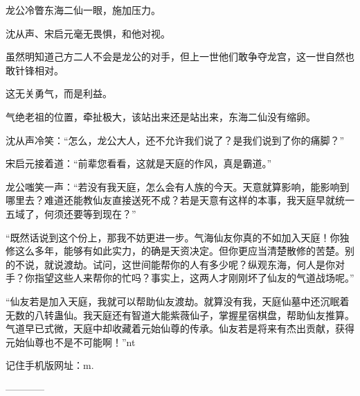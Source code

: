 \begin{this_body}
龙公冷瞥东海二仙一眼，施加压力。

沈从声、宋启元毫无畏惧，和他对视。

虽然明知道己方二人不会是龙公的对手，但上一世他们敢争夺龙宫，这一世自然也敢针锋相对。

这无关勇气，而是利益。

气绝老祖的位置，牵扯极大，该站出来还是站出来，东海二仙没有缩卵。

沈从声冷笑：“怎么，龙公大人，还不允许我们说了？是我们说到了你的痛脚？”

宋启元接着道：“前辈您看看，这就是天庭的作风，真是霸道。”

龙公嗤笑一声：“若没有我天庭，怎么会有人族的今天。天意就算影响，能影响到哪里去？难道还能教仙友直接送死不成？若是天意有这样的本事，我天庭早就统一五域了，何须还要等到现在？”

“既然话说到这个份上，那我不妨更进一步。气海仙友你真的不如加入天庭！你独修这么多年，能够有如此实力，的确是天资决定。但你更应当清楚散修的苦楚。别的不说，就说渡劫。试问，这世间能帮你的人有多少呢？纵观东海，何人是你对手？你指望这些人来帮你的忙吗？事实上，这两人才刚刚坏了仙友的气道战场呢。”

“仙友若是加入天庭，我就可以帮助仙友渡劫。就算没有我，天庭仙墓中还沉眠着无数的八转蛊仙。我天庭还有智道大能紫薇仙子，掌握星宿棋盘，帮助仙友推算。气道早已式微，天庭中却收藏着元始仙尊的传承。仙友若是将来有杰出贡献，获得元始仙尊也不是不可能啊！”nt

记住手机版网址：m.

------------

\end{this_body}

